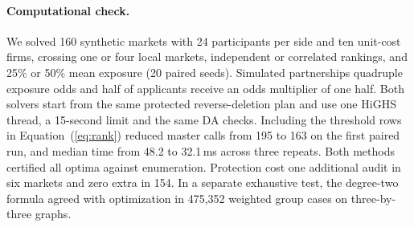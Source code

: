 \paragraph{Computational check.}
We solved 160 synthetic markets with 24 participants per side and ten unit-cost firms, crossing one or four local markets, independent or correlated rankings, and 25\% or 50\% mean exposure (20 paired seeds). Simulated partnerships quadruple exposure odds and half of applicants receive an odds multiplier of one half. Both solvers start from the same protected reverse-deletion plan and use one HiGHS thread, a 15-second limit and the same DA checks. Including the threshold rows in Equation~(\ref{eq:rank}) reduced master calls from 195 to 163 on the first paired run, and median time from 48.2 to 32.1\,ms across three repeats. Both methods certified all optima against enumeration. Protection cost one additional audit in six markets and zero extra in 154. In a separate exhaustive test, the degree-two formula agreed with optimization in 475,352 weighted group cases on three-by-three graphs.

